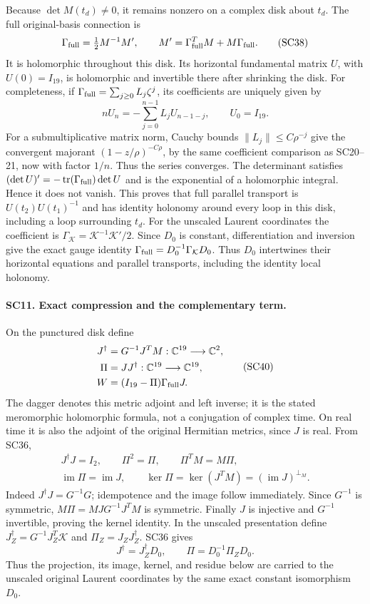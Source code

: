 Because \(\det M(t_d)\ne0\), it remains nonzero on a complex
disk about \(t_d\). The full original-basis connection is
\[
 \Gamma_{\rm full}=\tfrac12M^{-1}M',\qquad
 M'=\Gamma_{\rm full}^TM+M\Gamma_{\rm full}.
 \tag{SC38}
\]
It is holomorphic throughout this disk. Its horizontal
fundamental matrix \(U\), with \(U(0)=I_{19}\), is holomorphic
and invertible there after shrinking the disk. For completeness,
if \(\Gamma_{\rm full}=\sum_{j\ge0}L_j\zeta^j\), its
coefficients are uniquely given by
\[
 nU_n=-\sum_{j=0}^{n-1}L_jU_{n-1-j},\qquad U_0=I_{19}.
 \tag{SC39}
\]
For a submultiplicative matrix norm, Cauchy bounds
\(\|L_j\|\le C\rho^{-j}\) give the convergent majorant
\((1-z/\rho)^{-C\rho}\), by the same coefficient comparison
as SC20--21, now with factor \(1/n\). Thus the series converges.
The determinant satisfies
\((\det U)'=-\operatorname{tr}(\Gamma_{\rm full})\det U\)
and is the exponential of a holomorphic integral. Hence it
does not vanish. This proves that full parallel transport is
\(U(t_2)U(t_1)^{-1}\) and has identity holonomy around every
loop in this disk, including a loop surrounding \(t_d\).
For the unscaled Laurent coordinates the coefficient is
\(\Gamma_{\mathcal K}=\mathcal K^{-1}\mathcal K'/2\).
Since \(D_0\) is constant, differentiation and inversion give
the exact gauge identity
\(\Gamma_{\rm full}=D_0^{-1}\Gamma_{\mathcal K}D_0\).
Thus \(D_0\) intertwines their horizontal equations and
parallel transports, including the identity local holonomy.

\paragraph{SC11. Exact compression and the complementary term.}
On the punctured disk define
\[
 \begin{split}
 J^\dagger&=G^{-1}J^TM:\mathbb C^{19}\longrightarrow\mathbb C^2,\\
 \Pi&=JJ^\dagger:\mathbb C^{19}\longrightarrow\mathbb C^{19},\\
 W&=(I_{19}-\Pi)\Gamma_{\rm full}J .
 \end{split}\tag{SC40}
\]
The dagger denotes this metric adjoint and left inverse; it
is the stated meromorphic holomorphic formula, not a
conjugation of complex time. On real time it is also the
adjoint of the original Hermitian metrics, since \(J\) is
real. From SC36,
\[
 \begin{gathered}
 J^\dagger J=I_2,\qquad \Pi^2=\Pi,\qquad
 \Pi^TM=M\Pi,\\
 \operatorname{im}\Pi=\operatorname{im}J,\qquad
 \ker\Pi=\ker(J^TM)=(\operatorname{im}J)^{\perp_M}.
 \end{gathered}\tag{SC41}
\]
Indeed \(J^\dagger J=G^{-1}G\); idempotence and the image
follow immediately. Since \(G^{-1}\) is symmetric,
\(M\Pi=MJG^{-1}J^TM\) is symmetric. Finally \(J\) is
injective and \(G^{-1}\) invertible, proving the kernel
identity.
In the unscaled presentation define
\(J_Z^\dagger=G^{-1}J_Z^T\mathcal K\) and
\(\Pi_Z=J_ZJ_Z^\dagger\). SC36 gives
\[
 J^\dagger=J_Z^\dagger D_0,\qquad
 \Pi=D_0^{-1}\Pi_ZD_0 .
\]
Thus the projection, its image, kernel, and residue below
are carried to the unscaled original Laurent coordinates
by the same exact constant isomorphism \(D_0\).


